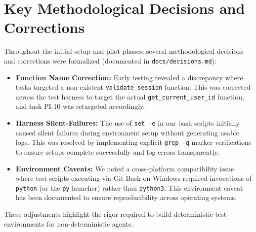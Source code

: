 \section{Key Methodological Decisions and Corrections}

Throughout the initial setup and pilot phases, several methodological decisions and corrections were formalized (documented in \texttt{docs/decisions.md}):

\begin{itemize}
    \item \textbf{Function Name Correction:} Early testing revealed a discrepancy where tasks targeted a non-existent \texttt{validate\_session} function. This was corrected across the test harness to target the actual \texttt{get\_current\_user\_id} function, and task PI-10 was retargeted accordingly.
    \item \textbf{Harness Silent-Failures:} The use of \texttt{set -e} in our bash scripts initially caused silent failures during environment setup without generating usable logs. This was resolved by implementing explicit \texttt{grep -q} marker verifications to ensure setups complete successfully and log errors transparently.
    \item \textbf{Environment Caveats:} We noted a cross-platform compatibility issue where test scripts executing via Git Bash on Windows required invocations of \texttt{python} (or the \texttt{py} launcher) rather than \texttt{python3}. This environment caveat has been documented to ensure reproducibility across operating systems.
\end{itemize}

These adjustments highlight the rigor required to build deterministic test environments for non-deterministic agents.
